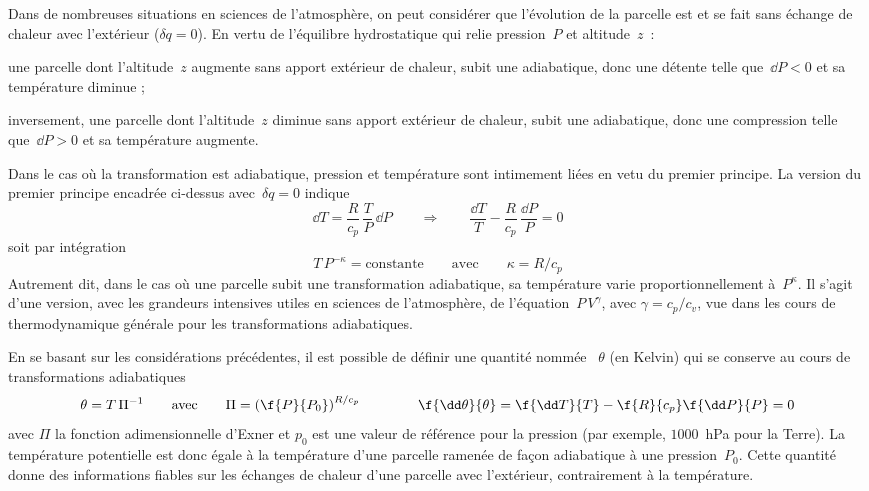 \sk
Dans de nombreuses situations en sciences de l'atmosphère, on peut considérer que l'évolution de la parcelle est  et se fait sans échange de chaleur avec l'extérieur ($\delta q=0$). En vertu de l'équilibre hydrostatique qui relie pression~$P$ et altitude~$z$~:
\begin{citemize}
\item une parcelle dont l'altitude~$z$ augmente sans apport extérieur de chaleur, subit une  adiabatique, donc une détente telle que~$\dd P < 0$ et sa température diminue ;
\item inversement, une parcelle dont l'altitude~$z$ diminue sans apport extérieur de chaleur, subit une  adiabatique, donc une compression telle que~$\dd P > 0$ et sa température augmente. 
\end{citemize}

\sk
Dans le cas où la transformation est adiabatique, pression et température sont intimement liées en vetu du premier principe. La version du premier principe encadrée ci-dessus avec~$\delta q = 0$ indique
\[ \dd T = \frac{R}{c_p} \, \frac{T}{P} \, \dd P \qquad \Rightarrow \qquad \frac{\dd T}{T} - \frac{R}{c_p} \, \frac{\dd P}{P} = 0 \]
soit par intégration
\[ T \, P^{- \kappa} = \text{constante} \qquad \text{avec} \qquad \kappa = R / c_p \]
Autrement dit, dans le cas où une parcelle subit une transformation adiabatique, sa température varie proportionnellement à~$P^{\kappa}$. Il s'agit d'une version, avec les grandeurs intensives utiles en sciences de l'atmosphère, de l'équation~$P\,V^{\gamma}$, avec $\gamma = c_p / c_v$, vue dans les cours de thermodynamique générale pour les transformations adiabatiques.

\sk
En se basant sur les considérations précédentes, il est possible de définir une quantité nommée ~$\theta$ (en Kelvin) qui se conserve au cours de transformations adiabatiques
\[ \theta  = T \, \Pi^{-1} \qquad \textrm{avec} \qquad \Pi = \left( \f{P}{P_0} \right)^{R/c_p} 
\qquad \qquad
\f{\dd \theta}{\theta} = \f{\dd T}{T} - \f{R}{c_p} \f{\dd P}{P} = 0
\]
\noindent avec $\Pi$ la fonction adimensionnelle d'Exner et $p_0$ est une valeur de référence pour la pression (par exemple, $1000$~hPa pour la Terre). La température potentielle est donc égale à la température d'une parcelle ramenée de façon adiabatique à une pression~$P_0$. Cette quantité donne des informations fiables sur les échanges de chaleur d'une parcelle avec l'extérieur, contrairement à la température.
